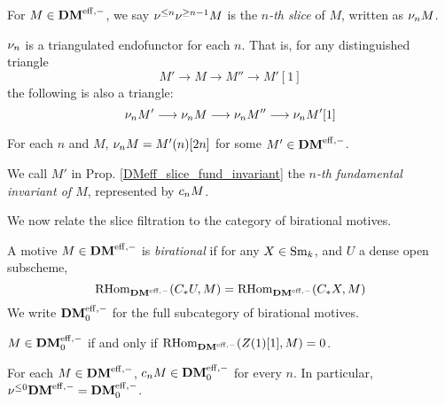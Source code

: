 \begin{defn}
For $M \in \mathbf{DM}^{\mathrm{eff},-}$, we say $\nu^{\leq n}\nu^{\geq n - 1}M$ is the 
\emph{$n$-th slice} of $M$, written as $\nu_{n}M$.
\end{defn}

\begin{prop}
$\nu_{n}$ is a triangulated endofunctor for each $n$. That is,
for any distinguished triangle
\[
M' \to M \to M'' \to M'[1]
\]
the following is also a triangle:
\[
\nu_{n}M' \longrightarrow \nu_{n}M \longrightarrow \nu_{n}M'' \longrightarrow \nu_{n}M'[1]
\]
\end{prop}

\begin{prop}\label{DMeff_slice_fund_invariant}
For each $n$ and $M$, $\nu_{n}M = M'(n)[2n]$ for some $M' \in
\mathbf{DM}^{\mathrm{eff},-}$.
\end{prop}

\begin{defn}
We call $M'$ in Prop. \ref{DMeff_slice_fund_invariant} the 
\emph{$n$-th fundamental invariant of $M$}, represented by
$c_{n}M$.
\end{defn}

We now relate the slice filtration to the category of birational
motives.

\begin{defn}
A motive $M \in \mathbf{DM}^{\mathrm{eff},-}$ is \emph{birational} if for any $X \in 
\mathrm{Sm}_{k}$, and $U$ a dense open subscheme,
\[
\mathrm{RHom}_{\mathbf{DM}^{\mathrm{eff},-}}(C_{*}{U}, M) = \mathrm{RHom}_{\mathbf{DM}^{\mathrm{eff},-}}(C_{*}{X}, M)
\]
We write $\mathbf{DM}^{\mathrm{eff},-}_0$ for the full subcategory of birational motives.
\end{defn}

\begin{prop}
$M \in \mathbf{DM}^{\mathrm{eff},-}_0$ if and only if $\mathrm{RHom}_{\mathbf{DM}^{\mathrm{eff},-}}(Z(1)[1], M) = 0$.
\end{prop}

\begin{prop}
For each $M \in \mathbf{DM}^{\mathrm{eff},-}$, $c_{n}M \in \mathbf{DM}^{\mathrm{eff},-}_0$ for every $n$.
In particular, $\nu^{\leq 0}\mathbf{DM}^{\mathrm{eff},-} = \mathbf{DM}^{\mathrm{eff},-}_0$.
\end{prop}
